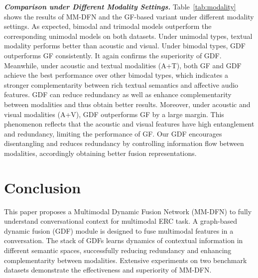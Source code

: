 \documentclass{article}
\begin{document}
 \textit{\textbf{Comparison under Different Modality Settings.}}
Table~\ref{tab:modality} shows the results of MM-DFN and the GF-based variant under different modality settings.
As expected, bimodal and trimodal models outperform the corresponding unimodal models on both datasets. Under unimodal types, textual modality performs better than acoustic and visual. 
Under bimodal types, GDF outperforms GF consistently.
It again confirms the superiority of GDF. Meanwhile, under acoustic and textual modalities (A+T), both GF and GDF achieve the best performance over other bimodal types, which indicates a stronger complementarity between rich textual semantics and affective audio features. GDF can reduce redundancy as well as enhance complementarity between modalities and thus obtain better results. 
Moreover, under acoustic and visual modalities (A+V), GDF outperforms GF by a large margin.
This phenomenon reflects that the acoustic and visual features have high entanglement and redundancy, limiting the performance of GF.
Our GDF encourages disentangling and reduces redundancy by controlling information flow between modalities, accordingly obtaining better fusion representations.














































\section{Conclusion}




This paper proposes a Multimodal Dynamic Fusion Network (MM-DFN) to fully understand conversational context for multimodal ERC task. 
A graph-based dynamic fusion (GDF) module is designed to fuse multimodal features in a conversation. The stack of GDFs learns dynamics of contextual information in different semantic spaces, successfully reducing redundancy and enhancing complementarity between modalities. 
Extensive experiments on two benchmark datasets demonstrate the effectiveness and superiority of MM-DFN. 
\end{document}
